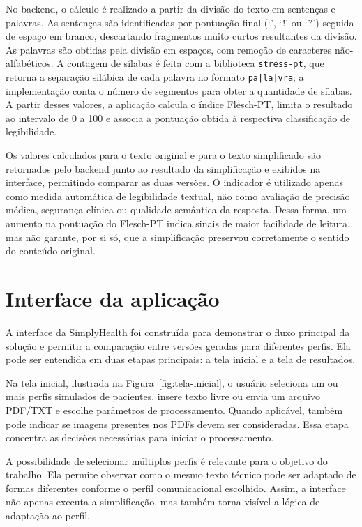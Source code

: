 No backend, o cálculo é realizado a partir da divisão do texto em sentenças e palavras. As sentenças são identificadas por pontuação final (`.', `!' ou `?') seguida de espaço em branco, descartando fragmentos muito curtos resultantes da divisão. As palavras são obtidas pela divisão em espaços, com remoção de caracteres não-alfabéticos. A contagem de sílabas é feita com a biblioteca \texttt{stress-pt}, que retorna a separação silábica de cada palavra no formato \texttt{pa|la|vra}; a implementação conta o número de segmentos para obter a quantidade de sílabas. A partir desses valores, a aplicação calcula o índice Flesch-PT, limita o resultado ao intervalo de 0 a 100 e associa a pontuação obtida à respectiva classificação de legibilidade.

Os valores calculados para o texto original e para o texto simplificado são retornados pelo backend junto ao resultado da simplificação e exibidos na interface, permitindo comparar as duas versões. O indicador é utilizado apenas como medida automática de legibilidade textual, não como avaliação de precisão médica, segurança clínica ou qualidade semântica da resposta. Dessa forma, um aumento na pontuação do Flesch-PT indica sinais de maior facilidade de leitura, mas não garante, por si só, que a simplificação preservou corretamente o sentido do conteúdo original.

\section{Interface da aplicação}
\label{sec:interface-aplicacao}

A interface da SimplyHealth foi construída para demonstrar o fluxo principal da solução e permitir a comparação entre versões geradas para diferentes perfis. Ela pode ser entendida em duas etapas principais: a tela inicial e a tela de resultados.

Na tela inicial, ilustrada na Figura~\ref{fig:tela-inicial}, o usuário seleciona um ou mais perfis simulados de pacientes, insere texto livre ou envia um arquivo PDF/TXT e escolhe parâmetros de processamento. Quando aplicável, também pode indicar se imagens presentes nos PDFs devem ser consideradas. Essa etapa concentra as decisões necessárias para iniciar o processamento.

A possibilidade de selecionar múltiplos perfis é relevante para o objetivo do trabalho. Ela permite observar como o mesmo texto técnico pode ser adaptado de formas diferentes conforme o perfil comunicacional escolhido. Assim, a interface não apenas executa a simplificação, mas também torna visível a lógica de adaptação ao perfil.

